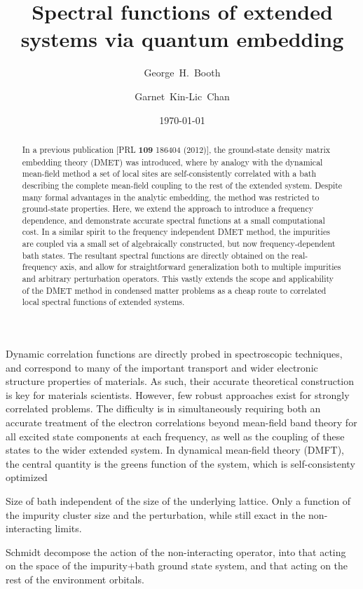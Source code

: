 \documentclass[aps,showpacs,twocolumn,nobibnotes]{revtex4}
\begin{document}
\title{Spectral functions of extended systems via quantum embedding}
\author{George~H.~Booth}
\author{Garnet~Kin-Lic~Chan}  

\begin{abstract}
In a previous publication [PRL {\bf 109} 186404 (2012)], the ground-state density matrix embedding theory (DMET) was introduced, where by analogy with the dynamical mean-field method a 
set of local sites are self-consistently correlated with a bath describing the complete mean-field coupling to the rest of the extended system. 
Despite many formal advantages in the analytic embedding, the method was restricted to ground-state properties.
Here, we extend the approach to introduce 
a frequency dependence, and demonstrate accurate spectral functions at a small 
computational cost. In a similar spirit to the frequency independent DMET method, the impurities are coupled via a small set of algebraically constructed, but now 
frequency-dependent bath states. The resultant spectral functions are directly obtained on the real-frequency axis, and allow for straightforward generalization both to 
multiple impurities and arbitrary perturbation operators. This vastly extends the scope and applicability of the DMET method in condensed matter problems as a 
cheap route to correlated local spectral functions of extended systems.
\end{abstract}
\date{\today}
\maketitle

Dynamic correlation functions are directly probed in spectroscopic techniques, and correspond to many of the important transport and wider electronic structure 
properties of materials. As such, their accurate theoretical construction is key for materials scientists. However, few robust approaches exist for strongly correlated problems.
The difficulty is in simultaneously requiring both an accurate treatment of the electron correlations beyond mean-field band theory for all excited state components at each frequency, 
as well as the coupling of these states to the wider extended system. In dynamical mean-field theory (DMFT), the central quantity is the greens function of the system, which is
self-consistenty optimized 

Size of bath independent of the size of the underlying lattice. Only a function of the impurity cluster size and the perturbation, while still exact in the non-interacting limits.

Schmidt decompose the action of the non-interacting operator, into that acting on the space of the impurity+bath ground state system, and that acting on the rest of the environment orbitals.

%
\end{document}
